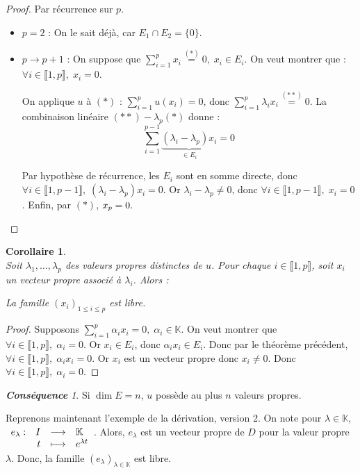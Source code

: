 \documentclass[12pt]{book}
\let\ensembleNombre\mathbb
\newcommand*\K{\ensuremath{\ensembleNombre{K}}}
\newcommand{\app}[5]{\ensuremath{
\begin{array}[t]{lrcl}
#1 : & #2 & \longrightarrow & #3 \\
    & #4 & \longmapsto & #5 \end{array}
}}
\newtheorem*{cor}{Corollaire}
\theoremstyle{definition}
\theoremstyle{remark}
\newtheorem*{cons}{\textbf{Conséquence}}
\begin{document}
	\begin{proof}
	Par récurrence sur $p$.
	
	\begin{itemize}
	\item \underline{$p = 2$} : On le sait déjà, car $E_1 \cap E_2 = \lbrace 0 \rbrace$.
	\item \underline{$p \to p+1$} : On suppose que $\sum_{i=1}^p x_i \overset{(*)}{=} 0, \; x_i \in E_i$. On veut montrer que : $\forall i \in \llbracket 1, p \rrbracket,\; x_i = 0$.
	
	On applique $u$ à $(*)$ : $\sum_{i=1}^p u(x_i) = 0$, donc $\sum_{i=1}^p \lambda_i x_i \overset{(**)}{=} 0$. La combinaison linéaire $(**) - \lambda_p (*)$ donne : 	
	\[ \sum_{i=1}^{p-1} \underbrace{(\lambda_i - \lambda_p) x_i}_{\in E_i} = 0 \]
	
	Par hypothèse de récurrence, les $E_i$ sont en somme directe, donc $\forall i \in \llbracket 1, p-1 \rrbracket,\;(\lambda_i - \lambda_p) x_i = 0$. Or $\lambda_i - \lambda_p \neq 0$, donc $\forall i \in \llbracket 1, p-1 \rrbracket, \; x_i = 0$. Enfin, par $(*)$, $x_p = 0. \qedhere$
	\end{itemize}
	\end{proof}
	
	\begin{cor} \mbox{~}\\
	Soit $\lambda_1, \ldots, \lambda_p$ des valeurs propres distinctes de $u$. Pour chaque $i \in \llbracket 1, p \rrbracket$, soit $x_i$ un vecteur propre associé à $\lambda_i$. Alors :
	\begin{center}
	La famille $(x_i)_{1 \leq i \leq p}$ est libre.
	\end{center}
	\end{cor}
	
	\begin{proof}
	Supposons $\sum_{i=1}^p \alpha_i x_i = 0, \; \alpha_i \in \K$. On veut montrer que $\forall i \in \llbracket 1, p \rrbracket, \; \alpha_i = 0$. Or $x_i \in E_i$, donc $\alpha_i x_i \in E_i$. Donc par le théorème précédent, $\forall i \in \llbracket 1, p \rrbracket, \; \alpha_i x_i = 0$. Or $x_i$ est un vecteur propre donc $x_i \neq 0$. Donc $\forall i \in \llbracket 1, p \rrbracket, \; \alpha_i = 0$.
	\end{proof}
	
	\begin{cons}
	Si $\dim E = n$, $u$ possède au plus $n$ valeurs propres.
	\end{cons}
	
	Reprenons maintenant l'exemple de la dérivation, version 2. On note pour $\lambda \in \K$, $\app{e_\lambda}{I}{\K}{t}{e^{\lambda t}}$. Alors, $e_\lambda$ est un vecteur propre de $D$ pour la valeur propre $\lambda$. Donc, la famille $(e_\lambda)_{\lambda \in \K}$ est libre.
\end{document}
